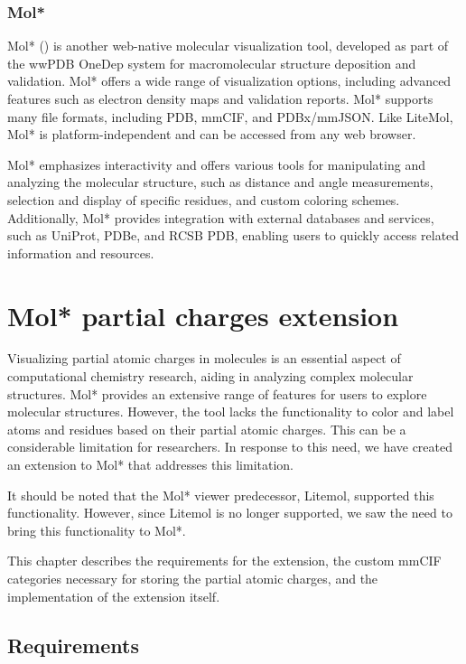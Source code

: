 \documentclass[
  digital,     %
  oneside,     %
  nosansbold,  %
  nocolorbold, %
  lof,         %
  lot,         %
]{fithesis4}
\begin{document}
\subsection{Mol*}
\label{subsection:molstar}

\parencite{sehnal-molstar}

Mol* () is another web-native molecular visualization tool, developed as part of the wwPDB OneDep system for macromolecular structure deposition and validation. Mol* offers a wide range of visualization options, including advanced features such as electron density maps and validation reports. Mol* supports many file formats, including PDB, mmCIF, and PDBx/mmJSON. Like LiteMol, Mol* is platform-independent and can be accessed from any web browser.

Mol* emphasizes interactivity and offers various tools for manipulating and analyzing the molecular structure, such as distance and angle measurements, selection and display of specific residues, and custom coloring schemes. Additionally, Mol* provides integration with external databases and services, such as UniProt, PDBe, and RCSB PDB, enabling users to quickly access related information and resources.

\chapter{Mol* partial charges extension}
\label{chapter:molstar_partial_charges_extension}

Visualizing partial atomic charges in molecules is an essential aspect of computational chemistry research, aiding in analyzing complex molecular structures. Mol* provides an extensive range of features for users to explore molecular structures. However, the tool lacks the functionality to color and label atoms and residues based on their partial atomic charges.
This can be a considerable limitation for researchers. In response to this need, we have created an extension to Mol* that addresses this limitation.

It should be noted that the Mol* viewer predecessor, Litemol, supported this functionality. However, since Litemol is no longer supported, we saw the need to bring this functionality to Mol*.

This chapter describes the requirements for the extension, the custom mmCIF categories necessary for storing the partial atomic charges, and the implementation of the extension itself.

\section{Requirements}
\label{section:requirements}
\end{document}
